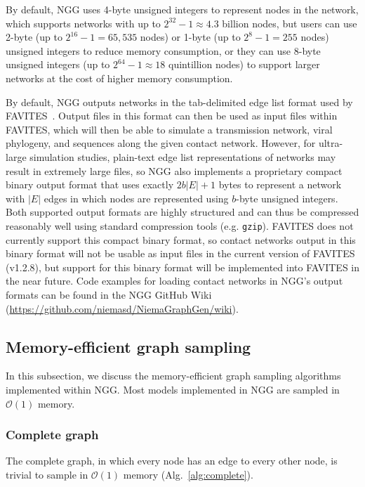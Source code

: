 \documentclass[a4paper,num-refs,gigabyte]{oup-contemporary}
\begin{document}
By default, NGG uses 4-byte unsigned integers to represent nodes in the network, which supports networks with up to $2^{32}-1\approx4.3$ billion nodes, but users can use 2-byte (up to $2^{16}-1=65,535$ nodes) or 1-byte (up to $2^8-1=255$ nodes) unsigned integers to reduce memory consumption, or they can use 8-byte unsigned integers (up to $2^{64}-1\approx18$ quintillion nodes) to support larger networks at the cost of higher memory consumption.

By default, NGG outputs networks in the tab-delimited edge list format used by FAVITES~\cite{Moshiri2018}.
Output files in this format can then be used as input files within FAVITES, which will then be able to simulate a transmission network, viral phylogeny, and sequences along the given contact network.
However, for ultra-large simulation studies, plain-text edge list representations of networks may result in extremely large files, so NGG also implements a proprietary compact binary output format that uses exactly $2b\left|E\right|+1$ bytes to represent a network with $\left|E\right|$ edges in which nodes are represented using $b$-byte unsigned integers. Both supported output formats are highly structured and can thus be compressed reasonably well using standard compression tools (e.g. \texttt{gzip}).
FAVITES does not currently support this compact binary format, so contact networks output in this binary format will not be usable as input files in the current version of FAVITES (v1.2.8), but support for this binary format will be implemented into FAVITES in the near future. Code examples for loading contact networks in NGG's output formats can be found in the NGG GitHub Wiki (\href{https://github.com/niemasd/NiemaGraphGen/wiki}{https://github.com/niemasd/NiemaGraphGen/wiki}).

\subsection{Memory-efficient graph sampling}
In this subsection, we discuss the memory-efficient graph sampling algorithms implemented within NGG. Most models implemented in NGG are sampled in $\mathcal{O}\left(1\right)$ memory.

\subsubsection{Complete graph}
The complete graph, in which every node has an edge to every other node, is trivial to sample in $\mathcal{O}\left(1\right)$ memory (Alg.~\ref{alg:complete}).
\end{document}
